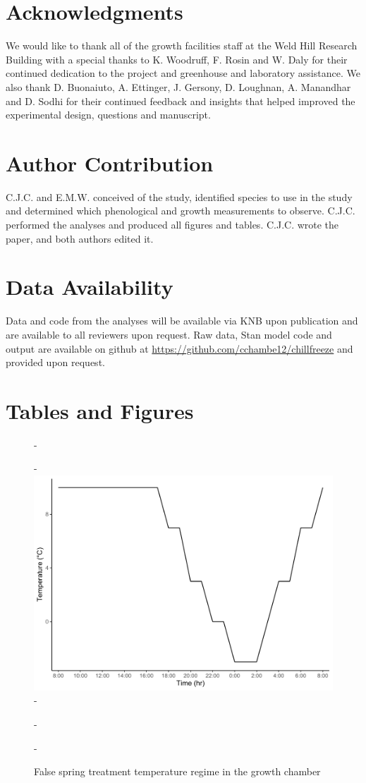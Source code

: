 \documentclass{article}\usepackage[]{graphicx}\usepackage[]{color}
\begin{document}
\section*{Acknowledgments}
We would like to thank all of the growth facilities staff at the Weld Hill Research Building with a special thanks to K. Woodruff, F. Rosin and W. Daly for their continued dedication to the project and greenhouse and laboratory assistance. We also thank D. Buonaiuto, A. Ettinger, J. Gersony, D. Loughnan, A. Manandhar and D. Sodhi for their continued feedback and insights that helped improved the experimental design, questions and manuscript.

\section*{Author Contribution} 
C.J.C. and E.M.W. conceived of the study, identified species to use in the study and determined which phenological and growth measurements to observe. C.J.C. performed the analyses and produced all figures and tables. C.J.C. wrote the paper, and both authors edited it.

\section*{Data Availability}
Data and code from the analyses will be available via KNB upon publication and are available to all reviewers upon request. Raw data, {Stan} model code and output are available on github at \url{https://github.com/cchambe12/chillfreeze} and provided upon request.




\section*{Tables and Figures}

{\begin{figure} [H]
  -\begin{center}
  -\includegraphics[width=12cm]{..//analyses/figures/growthchamber.pdf}
  -\caption{False spring treatment temperature regime in the growth chamber}\label{fig:gccond}
  -\end{center}
  -\end{figure}}
  
\end{document}
